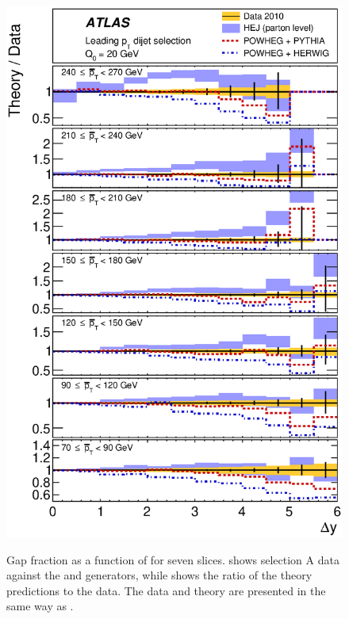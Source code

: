 \begin{figure}[htpb]
{    \includegraphics[width=\smallfigwidth]{chapters/gbj/GapFraction_YDist_gap_Q0_sel_A_Ratio.eps}
    \label{fig:gbj:Gap_fraction_dY_A_ratio}}
  \caption{Gap fraction as a function of \DeltaY for seven \pTbar slices. \protect{}
           shows selection A data against the \HEJ and \Powheg generators, while \protect{}
           shows the ratio of the theory predictions to the data. The data and theory
           are presented in the same way as .}
  \label{fig:gbj:Gap_fraction_dY_A}
\end{figure}

